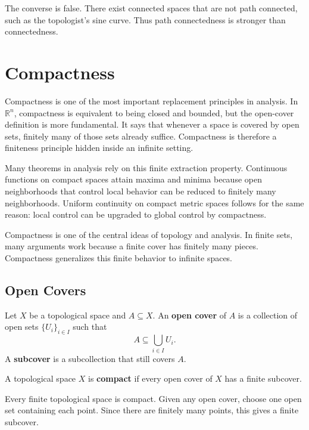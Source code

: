 \begin{remark}
The converse is false. There exist connected spaces that are not path connected, such as the topologist's sine curve. Thus path connectedness is stronger than connectedness.
\end{remark}

\section{Compactness}


Compactness is one of the most important replacement principles in analysis. In $\mathbb{R}^n$, compactness is equivalent to being closed and bounded, but the open-cover definition is more fundamental. It says that whenever a space is covered by open sets, finitely many of those sets already suffice. Compactness is therefore a finiteness principle hidden inside an infinite setting.

Many theorems in analysis rely on this finite extraction property. Continuous functions on compact spaces attain maxima and minima because open neighborhoods that control local behavior can be reduced to finitely many neighborhoods. Uniform continuity on compact metric spaces follows for the same reason: local control can be upgraded to global control by compactness.

Compactness is one of the central ideas of topology and analysis. In finite sets, many arguments work because a finite cover has finitely many pieces. Compactness generalizes this finite behavior to infinite spaces.

\subsection{Open Covers}

\begin{definition}
Let $X$ be a topological space and $A\subseteq X$. An \textbf{open cover} of $A$ is a collection of open sets $\{U_i\}_{i\in I}$ such that
\[
    A\subseteq\bigcup_{i\in I}U_i.
\]
A \textbf{subcover} is a subcollection that still covers $A$.
\end{definition}

\begin{definition}[Compactness]
A topological space $X$ is \textbf{compact} if every open cover of $X$ has a finite subcover.
\end{definition}

\begin{example}
Every finite topological space is compact. Given any open cover, choose one open set containing each point. Since there are finitely many points, this gives a finite subcover.
\end{example}

